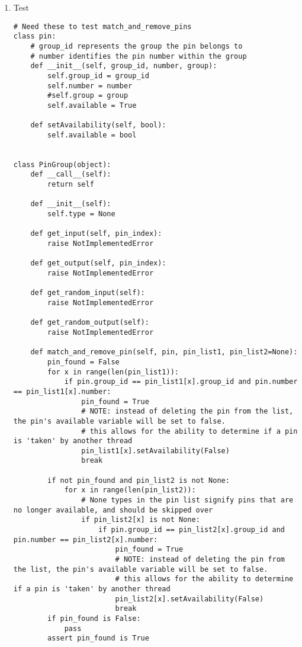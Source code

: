 \documentclass[a4paper]{article}
\begin{document}
\begin{enumerate}
\item Test
\label{sec-4-3-1-1}
\begin{verbatim}
# Need these to test match_and_remove_pins
class pin:
    # group_id represents the group the pin belongs to
    # number identifies the pin number within the group
    def __init__(self, group_id, number, group):
        self.group_id = group_id
        self.number = number
        #self.group = group
        self.available = True

    def setAvailability(self, bool):
        self.available = bool


class PinGroup(object):
    def __call__(self):
        return self

    def __init__(self):
        self.type = None

    def get_input(self, pin_index):
        raise NotImplementedError

    def get_output(self, pin_index):
        raise NotImplementedError

    def get_random_input(self):
        raise NotImplementedError

    def get_random_output(self):
        raise NotImplementedError

    def match_and_remove_pin(self, pin, pin_list1, pin_list2=None):
        pin_found = False
        for x in range(len(pin_list1)):
            if pin.group_id == pin_list1[x].group_id and pin.number == pin_list1[x].number:
                pin_found = True
                # NOTE: instead of deleting the pin from the list, the pin's available variable will be set to false.
                # this allows for the ability to determine if a pin is 'taken' by another thread
                pin_list1[x].setAvailability(False)
                break

        if not pin_found and pin_list2 is not None:
            for x in range(len(pin_list2)):
                # None types in the pin list signify pins that are no longer available, and should be skipped over
                if pin_list2[x] is not None:
                    if pin.group_id == pin_list2[x].group_id and pin.number == pin_list2[x].number:
                        pin_found = True
                        # NOTE: instead of deleting the pin from the list, the pin's available variable will be set to false.
                        # this allows for the ability to determine if a pin is 'taken' by another thread
                        pin_list2[x].setAvailability(False)
                        break
        if pin_found is False:
            pass
        assert pin_found is True



\end{verbatim}
\end{enumerate}
\end{document}
